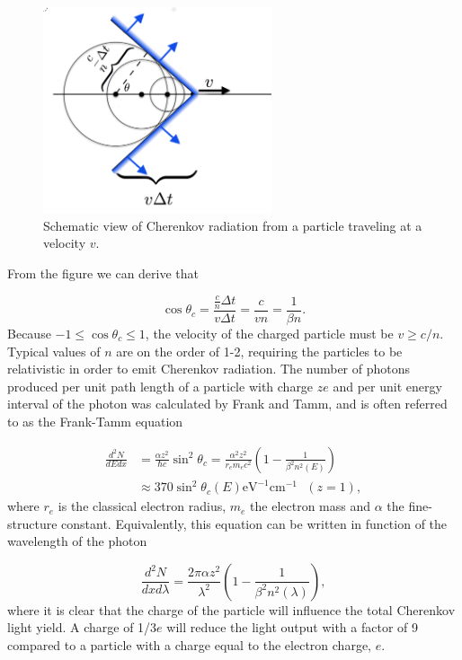 \begin{figure}[ht]
\centering
\includegraphics[width=0.6\textwidth]{chapter4/img/cherenkov2.png}
\caption{Schematic view of Cherenkov radiation from a particle traveling at a velocity $v$.}
\label{fig:cherenkov}
\end{figure}

\noindent From the figure we can derive that

\begin{equation}
\cos\theta_c = \frac{\frac{c}{n} \Delta t}{v \Delta t} = \frac{c}{vn} = \frac{1}{\beta n}.
\end{equation} 
Because $-1 \leq \cos\theta_c \leq 1$, the velocity of the charged particle must be $v \geq c/n$. Typical values of $n$ are on the order of 1-2, requiring the particles to be relativistic in order to emit Cherenkov radiation. The number of photons produced per unit path length of a particle with charge $ze$ and per unit energy interval of the photon was calculated by Frank and Tamm, and is often referred to as the Frank-Tamm equation \cite{PDG2018url}

\begin{equation}
\begin{split}
\frac{d^2N}{dE dx} &= \frac{\alpha z^2}{\hbar c} \sin^2 \theta_c = \frac{\alpha^2 z^2}{r_e m_e c^2} \left( 1 - \frac{1}{\beta^2 n^2\left(E\right)} \right)\\
&\approx 370 \sin^2 \theta_c \left(E\right) \textrm{eV}^{-1} \textrm{cm}^{-1} \ \ \ \left( z =1\right),
\end{split}
\end{equation}
where $r_e$ is the classical electron radius, $m_e$ the electron mass and $\alpha$ the fine-structure constant. Equivalently, this equation can be written in function of the wavelength of the photon

\begin{equation}
\label{eq:franktamm}
\frac{d^2N}{dx d\lambda}  = \frac{2\pi \alpha z^2}{\lambda^2} \left(1- \frac{1}{\beta^2 n^2 \left(\lambda \right)} \right),
\end{equation}
where it is clear that the charge of the particle will influence the total Cherenkov light yield. A charge of 1/3$e$ will reduce the light output with a factor of 9 compared to a particle with a charge equal to the electron charge, $e$.\\

